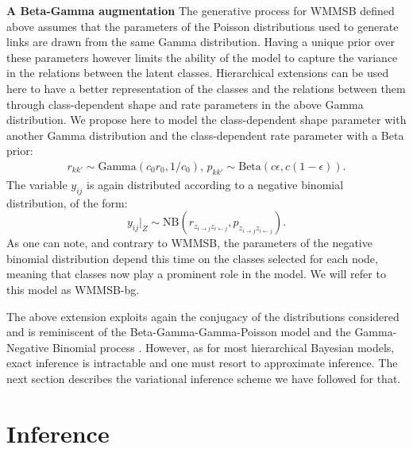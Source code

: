\textbf{A Beta-Gamma augmentation} The generative process for WMMSB defined above assumes that the parameters of the Poisson distributions used to generate links are drawn from the same Gamma distribution. Having a unique prior over these parameters however limits the ability of the model to capture the variance in the relations between the latent classes. Hierarchical extensions can be used here to have a better representation of the classes and the relations between them through class-dependent shape and rate parameters in the above Gamma distribution. We propose here to model the class-dependent shape parameter with another Gamma distribution and the class-dependent rate parameter with a Beta prior:
%
\begin{gather*}
r_{kk'} \sim \textrm{Gamma}(c_0r_0, 1/c_0), \, p_{kk'} \sim \textrm{Beta}(c\epsilon, c(1-\epsilon)).
\end{gather*}
%
The variable $y_{ij}$ is again distributed according to a negative binomial distribution, of the form:
%
\begin{equation}\label{eq:yNB}
y_{ij}|_{Z} \sim \textrm{NB}(r_{z_{i \rightarrow j} z_{i \leftarrow j}},p_{z_{i \rightarrow j} z_{i \leftarrow j}}).
\end{equation}
%
As one can note, and contrary to WMMSB, the parameters of the negative binomial distribution depend this time on the classes selected for each node, meaning that classes now play a prominent role in the model. We will refer to this model as WMMSB-bg.

The above extension exploits again the conjugacy of the distributions considered and is reminiscent of the Beta-Gamma-Gamma-Poisson model \cite{zhou2012beta} and the Gamma-Negative Binomial process \cite{zhou2015negative}. However, as for most hierarchical Bayesian models, exact inference is intractable and one must resort to approximate inference. The next section describes the variational inference scheme we have followed for that.

\section{Inference}
\label{sec:inference}

